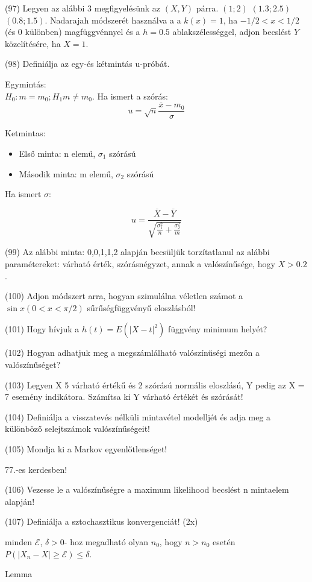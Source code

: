 \documentclass[12p]{article}
\begin{document}
(97) Legyen az alábbi 3 megfigyelésünk az $(X, Y)$ párra. $(1;2)$ $(1.3;2.5)$ $(0.8;1.5)$. Nadarajah
módszerét használva a a $k(x) = 1$, ha $-1/2 < x < 1/2$ (és 0 különben) magfüggvénnyel és a $h = 0.5$ ablakszélességgel, adjon becslést $Y$ közelítésére, ha $X = 1$.

(98) Definiálja az egy-és kétmintás u-próbát.

Egymintás:\\
$H_0: m=m_0; H_1 m \neq m_0$. Ha ismert a szórás:
$$u = \sqrt{n}\frac{\overline{x} - m_0}{\sigma}$$

Ketmintas:
\begin{itemize}
	\item Első minta: n elemű, $\sigma_1$ szórású
	\item Második minta: m elemű, $\sigma_2$ szórású
\end{itemize}

Ha ismert $\sigma$:

$$u = \frac{\overline{X} - \overline{Y}}{\sqrt{\frac{\sigma^2_1}{n} + \frac{\sigma^2_2}{m}}}$$

(99) Az alábbi minta: 0,0,1,1,2 alapján becsüljük torzítatlanul az alábbi paramétereket:
várható érték, szórásnégyzet, annak a valószínűsége, hogy $X > 0.2$.

(100) Adjon módszert arra, hogyan szimulálna véletlen számot a $\sin x (0 < x < \pi/2)$ sűrűségfüggvényű eloszlásból!

(101) Hogy hívjuk a $h(t) = E(|X - t|^2)$ függvény minimum helyét?

(102) Hogyan adhatjuk meg a megszámlálható valószínűségi mezőn a valószínűséget?

(103) Legyen X 5 várható értékű és 2 szórású normális eloszlású, Y pedig az X = 7 esemény indikátora. Számítsa ki Y várható értékét és szórását!

(104)  Definiálja a visszatevés nélküli mintavétel modelljét és adja meg a különböző selejtszámok valószínűségeit!

(105) Mondja ki a Markov egyenlőtlenséget!

77.-es kerdesben!

(106) Vezesse le a valószínűségre a maximum likelihood becslést n mintaelem alapján!

(107) Definiálja a sztochasztikus konvergenciát! (2x)

 minden $\mathcal{E}$, $\delta>0$-
hoz megadható olyan $n_0$, hogy $n>n_0$ esetén $P(|X_n-X| \geq \mathcal{E}) \leq \delta$.

Lemma
\end{document}

